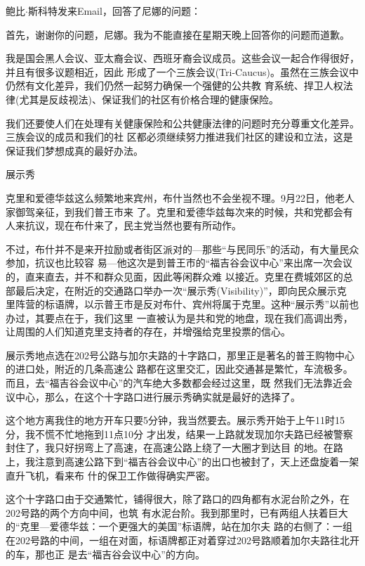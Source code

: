 ﻿\documentclass[11pt]{article}
\begin{document}
鲍比$\cdot$斯科特发来Email，回答了尼娜的问题：

首先，谢谢你的问题，尼娜。我为不能直接在星期天晚上回答你的问题而道歉。

我是国会黑人会议、亚太裔会议、西班牙裔会议成员。这些会议一起合作得很好，并且有很多议题相近，因此
形成了一个三族会议(Tri-Caucus)。虽然在三族会议中仍然有文化差异，我们仍然一起努力确保一个强健的公共教
育系统、捍卫人权法律(尤其是反歧视法)、保证我们的社区有价格合理的健康保险。

我们还要使人们在处理有关健康保险和公共健康法律的问题时充分尊重文化差异。三族会议的成员和我们的社
区都必须继续努力推进我们社区的建设和立法，这是保证我们梦想成真的最好办法。

展示秀

克里和爱德华兹这么频繁地来宾州，布什当然也不会坐视不理。9月22日，他老人家御驾亲征，到我们普王市来
了。克里和爱德华兹每次来的时候，共和党都会有人来抗议，现在布什来了，民主党当然也要有所动作。

不过，布什并不是来开拉励或者街区派对的---那些``与民同乐''的活动，有大量民众参加，抗议也比较容
易---他这次是到普王市的``福吉谷会议中心''来出席一次会议的，直来直去，并不和群众见面，因此等闲群众难
以接近。克里在费城郊区的总部最后决定，在附近的交通路口举办一次``展示秀(Visibility)''，即向民众展示克
里阵营的标语牌，以示普王市是反对布什、宾州将属于克里。这种``展示秀''以前也办过，其要点在于，我们这里
一直被认为是共和党的地盘，现在我们高调出秀，让周围的人们知道克里支持者的存在，并增强给克里投票的信心。

展示秀地点选在202号公路与加尔夫路的十字路口，那里正是著名的普王购物中心的进口处，附近的几条高速公
路都在这里交汇，因此交通甚是繁忙，车流极多。而且，去``福吉谷会议中心''的汽车绝大多数都会经过这里，既
然我们无法靠近会议中心，那么，在这个十字路口进行展示秀确实就是最好的选择了。

这个地方离我住的地方开车只要5分钟，我当然要去。展示秀开始于上午11时15分，我不慌不忙地拖到11点10分
才出发，结果一上路就发现加尔夫路已经被警察封住了，我只好拐弯上了高速，在高速公路上绕了一大圈才到达目
的地。在路上，我注意到高速公路下到``福吉谷会议中心''的出口也被封了，天上还盘旋着一架直升飞机，看来布
什的保卫工作做得确实严密。

这个十字路口由于交通繁忙，铺得很大，除了路口的四角都有水泥台阶之外，在202号路的两个方向中间，也筑
有水泥台阶。我到那里时，已有两组人扶着巨大的``克里---爱德华兹：一个更强大的美国''标语牌，站在加尔夫
路的右侧了：一组在202号路的中间，一组在对面，标语牌都正对着穿过202号路顺着加尔夫路往北开的车，那也正
是去``福吉谷会议中心''的方向。
\end{document}
